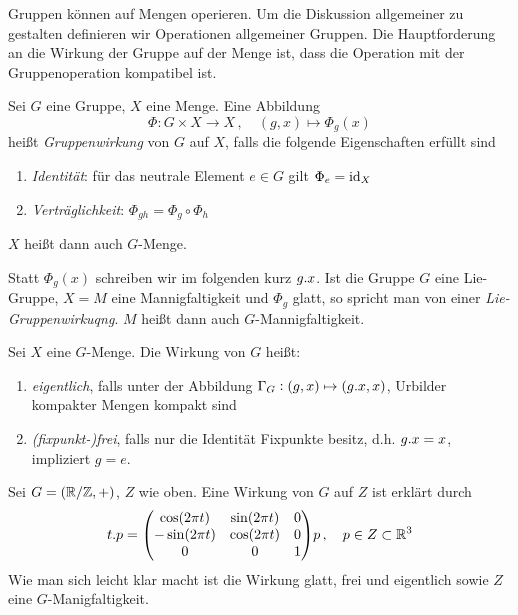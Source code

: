 Gruppen können auf Mengen operieren.  Um die Diskussion allgemeiner zu gestalten definieren wir
Operationen allgemeiner Gruppen. Die Hauptforderung an die Wirkung der Gruppe
auf der Menge ist, dass die Operation mit der Gruppenoperation kompatibel ist.
\begin{definition}[Gruppenwirkung]
Sei $G$ eine Gruppe, $X$ eine Menge. Eine Abbildung
\begin{equation}
\Phi:G\times X\to X\,,\quad (g,x)\mapsto\Phi_g(x)
\end{equation}
heißt \emph{Gruppenwirkung} von $G$ auf $X$, falls die folgende Eigenschaften
erfüllt sind
\begin{enumerate}
  \item \emph{Identität}: für das neutrale Element $e\in G$ gilt
  $\displaystyle\Phi_e=\operatorname{id}_X$
  \item \emph{Verträglichkeit}: $\displaystyle\Phi_{gh}=\Phi_g\circ\Phi_h$
\end{enumerate}
$X$ heißt dann auch $G$-Menge.
\end{definition}
Statt $\Phi_g(x)$ schreiben wir im folgenden kurz $g. x$.
Ist die Gruppe $G$ eine Lie-Gruppe, $X=M$ eine Mannigfaltigkeit und $\Phi_g$
glatt, so spricht man von einer \emph{Lie-Gruppenwirkuqng}. $M$ heißt dann auch
$G$-Mannigfaltigkeit.
\begin{definition}
Sei $X$ eine $G$-Menge. Die Wirkung von $G$ heißt:
\begin{enumerate}
  \item \emph{eigentlich}, falls unter der Abbildung $\Gamma_G:(g,x)\mapsto (g
  . x,x)$, Urbilder kompakter Mengen kompakt sind
  \item \emph{(fixpunkt-)frei}, falls nur die Identität Fixpunkte besitz, d.h.
  $g. x=x$, impliziert $g=e$.
\end{enumerate}
\end{definition}
\begin{beispiel}
Sei $G=(\mathbb{R}/\mathbb{Z},+)$, $Z$ wie oben. Eine Wirkung von $G$ auf $Z$ ist
erklärt durch
\begin{equation}
t.p= \begin{pmatrix}
\cos\left( 2\pi t\right)&\sin\left( 2\pi t\right)&0\\
-\sin\left( 2\pi t\right)&\cos\left( 2\pi t\right)&0\\
0&0&1
\end{pmatrix}p\,,\quad p\in Z\subset \Reals^3
\end{equation}
Wie man sich leicht klar macht ist die Wirkung glatt, frei und eigentlich sowie
$Z$ eine $G$-Manigfaltigkeit.
\end{beispiel}

